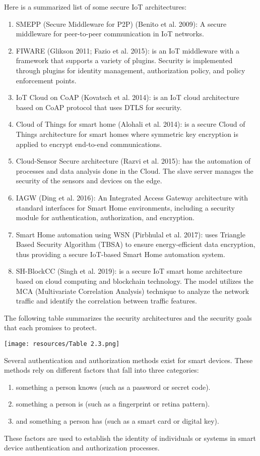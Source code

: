Here is a summarized list of some secure IoT architectures:
\begin{enumerate}
    \item SMEPP (Secure Middleware for P2P) (Benito et al. 2009): A secure middleware for peer-to-peer communication in IoT networks.
    \item FIWARE (Glikson 2011; Fazio et al. 2015): is an IoT middleware with a framework that supports a variety of plugins. Security is implemented through plugins for identity management, authorization policy, and policy enforcement points.
    \item IoT Cloud on CoAP (Kovatsch et al. 2014): is an IoT cloud architecture based on CoAP protocol that uses DTLS for security.
    \item Cloud of Things for smart home (Alohali et al. 2014): is a secure Cloud of Things architecture for smart homes where symmetric key encryption is applied to encrypt end-to-end communications.
    \item Cloud-Sensor Secure architecture (Razvi et al. 2015): has the automation of processes and data analysis done in the Cloud. The slave server manages the security of the sensors and devices on the edge.
    \item IAGW (Ding et al. 2016): An Integrated Access Gateway architecture with standard interfaces for Smart Home environments, including a security module for authentication, authorization, and encryption.
    \item Smart Home automation using WSN (Pirbhulal et al. 2017): uses Triangle Based Security Algorithm (TBSA) to ensure energy-efficient data encryption, thus providing a secure IoT-based Smart Home automation system.
    \item SH-BlockCC (Singh et al. 2019): is a secure IoT smart home architecture based on cloud computing and blockchain technology. The model utilizes the MCA (Multivariate Correlation Analysis) technique to analyze the network traffic and identify the correlation between traffic features.
\end{enumerate}

The following table summarizes the security architectures and the security goals that each promises to protect.


\texttt{[image: resources/Table 2.3.png]}

Several authentication and authorization methods exist for smart devices. These methods rely on different factors that fall into three categories:
\begin{enumerate}
    \item something a person knows (such as a password or secret code).
    \item  something a person is (such as a fingerprint or retina pattern).
    \item and something a person has (such as a smart card or digital key).
\end{enumerate}
These factors are used to establish the identity of individuals or systems in smart device authentication and authorization processes.

